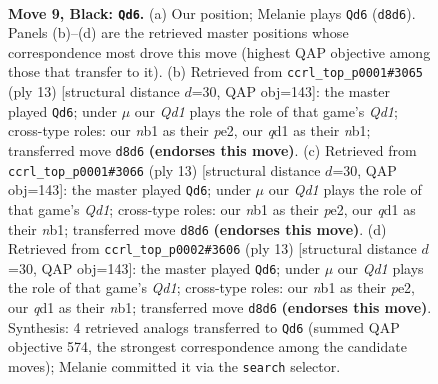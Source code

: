 \documentclass[11pt]{article}
\begin{document}
\clearpage

\begin{figure}[p]\centering
\begin{subfigure}{0.46\textwidth}\centering
\resizebox{\linewidth}{!}{%
\newchessgame
\chessboard[
  setfen={rnbq1rk1/ppp1bppp/1n2p3/4N3/2pP4/4B1P1/PP2PPBP/RN1QR1K1 b - - 5 9},
  showmover=false,
  pgfstyle=straightmove, color=movearrow, markmove={d8-d6}
]}
\caption{}
\end{subfigure}\hfill
\begin{subfigure}{0.46\textwidth}\centering
\resizebox{\linewidth}{!}{%
\newchessgame
\chessboard[
  setfen={rnbq1rk1/ppp1bppp/4pn2/4N3/2pP4/6P1/PP2PPBP/RNBQ1RK1 b - - 1 7},
  showmover=false,
  pgfstyle=straightmove, color=movearrow, markmove={d8-d6}
]}
\caption{}
\end{subfigure}
\\[4pt]
\begin{subfigure}{0.46\textwidth}\centering
\resizebox{\linewidth}{!}{%
\newchessgame
\chessboard[
  setfen={rnbq1rk1/ppp1bppp/4pn2/4N3/2pP4/6P1/PP2PPBP/RNBQ1RK1 b - - 1 7},
  showmover=false,
  pgfstyle=straightmove, color=movearrow, markmove={d8-d6}
]}
\caption{}
\end{subfigure}\hfill
\begin{subfigure}{0.46\textwidth}\centering
\resizebox{\linewidth}{!}{%
\newchessgame
\chessboard[
  setfen={rnbq1rk1/ppp1bppp/4pn2/4N3/2pP4/6P1/PP2PPBP/RNBQ1RK1 b - - 1 7},
  showmover=false,
  pgfstyle=straightmove, color=movearrow, markmove={d8-d6}
]}
\caption{}
\end{subfigure}
\caption{\textbf{Move 9, Black: \texttt{Qd6}.} (a) Our position; Melanie plays \texttt{Qd6} (\texttt{d8d6}). Panels (b)--(d) are the retrieved master positions whose correspondence most drove this move (highest QAP objective among those that transfer to it). (b) Retrieved from \texttt{ccrl\_top\_p0001\#3065} (ply 13) [structural distance $d$=30, QAP obj=143]: the master played \texttt{Qd6}; under $\mu$ our \emph{Qd1} plays the role of that game's \emph{Qd1}; cross-type roles: our \emph{n}b1 as their \emph{p}e2, our \emph{q}d1 as their \emph{n}b1; transferred move \texttt{d8d6} \textbf{(endorses this move)}. (c) Retrieved from \texttt{ccrl\_top\_p0001\#3066} (ply 13) [structural distance $d$=30, QAP obj=143]: the master played \texttt{Qd6}; under $\mu$ our \emph{Qd1} plays the role of that game's \emph{Qd1}; cross-type roles: our \emph{n}b1 as their \emph{p}e2, our \emph{q}d1 as their \emph{n}b1; transferred move \texttt{d8d6} \textbf{(endorses this move)}. (d) Retrieved from \texttt{ccrl\_top\_p0002\#3606} (ply 13) [structural distance $d$=30, QAP obj=143]: the master played \texttt{Qd6}; under $\mu$ our \emph{Qd1} plays the role of that game's \emph{Qd1}; cross-type roles: our \emph{n}b1 as their \emph{p}e2, our \emph{q}d1 as their \emph{n}b1; transferred move \texttt{d8d6} \textbf{(endorses this move)}. Synthesis: 4 retrieved analogs transferred to \texttt{Qd6} (summed QAP objective 574, the strongest correspondence among the candidate moves); Melanie committed it via the \texttt{search} selector.}
\label{fig:thought-m17}
\end{figure}
\end{document}
